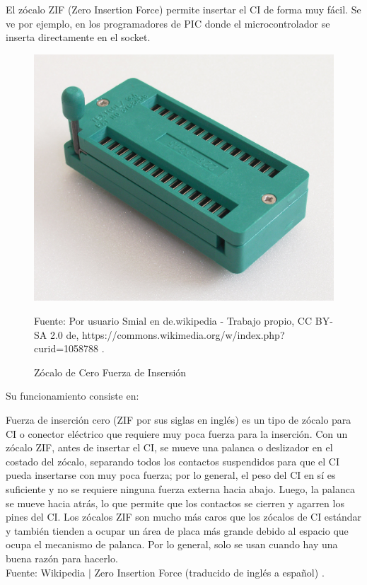 \documentclass[conference]{IEEEtran}
\begin{document}
    El zócalo ZIF (Zero Insertion Force) permite insertar el CI de forma muy
    fácil. Se ve por ejemplo, en los programadores de PIC donde el
    microcontrolador se inserta directamente en el socket.

    \begin{figure}[H]
        \centering
        \includegraphics[width=0.2\paperwidth]{images/zif-socket}
        \caption{Zócalo de Cero Fuerza de Insersión} \footnotesize
        Fuente: Por usuario Smial en de.wikipedia - Trabajo propio, CC BY-SA
        2.0 de, https://commons.wikimedia.org/w/index.php?curid=1058788
        \cite{wikipedia-zif-2021}.
    \end{figure}

    \bigbreak

    Su funcionamiento consiste en:

    \bigbreak

    \begin{displayquote}
        Fuerza de inserción cero (ZIF por sus siglas en inglés) es un tipo de
        zócalo para CI o conector eléctrico que requiere muy poca fuerza para
        la inserción. Con un zócalo ZIF, antes de insertar el CI, se mueve
        una palanca o deslizador en el costado del zócalo, separando todos
        los contactos suspendidos para que el CI pueda insertarse con muy
        poca fuerza; por lo general, el peso del CI en sí es suficiente y no
        se requiere ninguna fuerza externa hacia abajo. Luego, la palanca se
        mueve hacia atrás, lo que permite que los contactos se cierren y
        agarren los pines del CI. Los zócalos ZIF son mucho más caros que los
        zócalos de CI estándar y también tienden a ocupar un área de placa
        más grande debido al espacio que ocupa el mecanismo de palanca. Por
        lo general, solo se usan cuando hay una buena razón para hacerlo.\\
        \small
        Fuente: Wikipedia $\mid$ Zero Insertion Force (traducido de inglés a
        español) \cite{wikipedia-zif-2021}.
    \end{displayquote}
\end{document}

